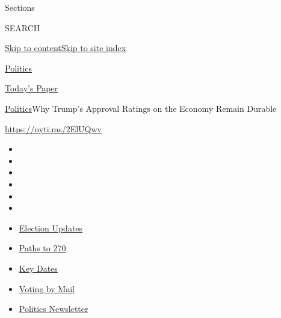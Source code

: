 Sections

SEARCH

\protect\hyperlink{site-content}{Skip to
content}\protect\hyperlink{site-index}{Skip to site index}

\href{https://www.nytimes3xbfgragh.onion/section/politics}{Politics}

\href{https://myaccount.nytimes3xbfgragh.onion/auth/login?response_type=cookie\&client_id=vi}{}

\href{https://www.nytimes3xbfgragh.onion/section/todayspaper}{Today's
Paper}

\href{/section/politics}{Politics}\textbar{}Why Trump's Approval Ratings
on the Economy Remain Durable

\url{https://nyti.ms/2ElUQwv}

\begin{itemize}
\item
\item
\item
\item
\item
\item
\end{itemize}

\begin{itemize}
\item
  \href{https://www.nytimes3xbfgragh.onion/live/2020/09/11/us/trump-vs-biden?action=click\&pgtype=Article\&state=default\&region=TOP_BANNER\&context=storylines_menu}{Election
  Updates}
\item
  \href{https://www.nytimes3xbfgragh.onion/interactive/2020/us/elections/election-states-biden-trump.html?action=click\&pgtype=Article\&state=default\&region=TOP_BANNER\&context=storylines_menu}{Paths
  to 270}
\item
  \href{https://www.nytimes3xbfgragh.onion/interactive/2019/us/elections/2020-presidential-election-calendar.html?action=click\&pgtype=Article\&state=default\&region=TOP_BANNER\&context=storylines_menu}{Key
  Dates}
\item
  \href{https://www.nytimes3xbfgragh.onion/interactive/2020/08/31/us/politics/vote-by-mail-deadlines.html?action=click\&pgtype=Article\&state=default\&region=TOP_BANNER\&context=storylines_menu}{Voting
  by Mail}
\item
  \href{https://www.nytimes3xbfgragh.onion/newsletters/politics?action=click\&pgtype=Article\&state=default\&region=TOP_BANNER\&context=storylines_menu}{Politics
  Newsletter}
\end{itemize}

